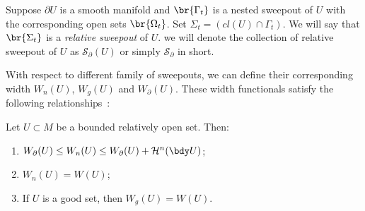 \begin{definition}\label{def:relative-sweepout}
Suppose $\partial U$ is a smooth manifold and $\br{\Gamma_t}$ is a nested sweepout of $U$ with the corresponding open sets $\br{\Omega_t}$. Set $\Sigma_t = (cl(U)\cap \Gamma_t)$. We will say that $\br{\Sigma_t}$ is a \emph{relative sweepout} of $U$. we will denote the collection of relative sweepout of $U$ as $\mathcal{S}_\partial(U)$ or simply $\mathcal{S}_\partial$ in short.
\end{definition}

With respect to different family of sweepouts, we can define their corresponding width $W_n(U)$, $W_g(U)$ and $W_\partial(U)$.
These width functionals satisfy the following relationships~\cite{CL20}:
\begin{proposition}\label{prop:width-inequalities}
Let $U \subset M$ be a bounded relatively open set. Then:
\begin{enumerate}[label=(\roman*)]
    \item $W_\partial(U) \leq W_n(U) \leq W_\partial(U) + \mathcal{H}^n(\bdy U)$;
    \item $W_n(U) = W(U)$;
    \item If $U$ is a good set, then $W_g(U) = W(U)$.
\end{enumerate}
\end{proposition}

